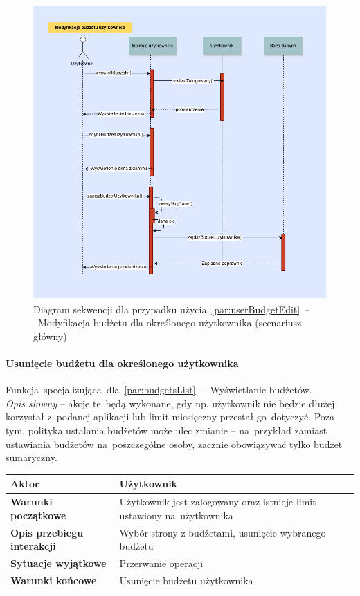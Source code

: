 \begin{figure}[H]
  \includegraphics[width=\textwidth]{images/modyfikacja_budzetu_uzytkownika.png}
  \caption{Diagram sekwencji dla przypadku użycia~\ref{par:userBudgetEdit}~--~Modyfikacja budżetu dla określonego użytkownika (scenariusz główny)}
\end{figure}

\paragraph{Usunięcie budżetu dla określonego użytkownika\newline}
\label{par:userBudgetDelete}
Funkcja~specjalizująca~dla~\ref{par:budgetsList}~--~Wyświetlanie budżetów.\\

\textit{Opis słowny} -- akcje te~będą wykonane, gdy np. użytkownik nie będzie dłużej korzystał z~podanej aplikacji lub limit miesięczny przestał go~dotyczyć. Poza tym, polityka ustalania budżetów może ulec zmianie -- na~przykład zamiast ustawiania budżetów na~poszczególne osoby, zacznie obowiązywać tylko budżet sumaryczny.

\begin{longtable}{|p{5cm}|p{7cm}|}
  \hline \textbf{Aktor} & Użytkownik \\
  \hline \textbf{Warunki początkowe} & Użytkownik jest zalogowany oraz istnieje limit ustawiony na~użytkownika \\
  \hline \textbf{Opis przebiegu interakcji} & Wybór strony z budżetami, usunięcie wybranego budżetu \\
  \hline \textbf{Sytuacje wyjątkowe} & Przerwanie operacji \\
  \hline \textbf{Warunki końcowe} & Usunięcie budżetu użytkownika \\
  \hline
\end{longtable}


